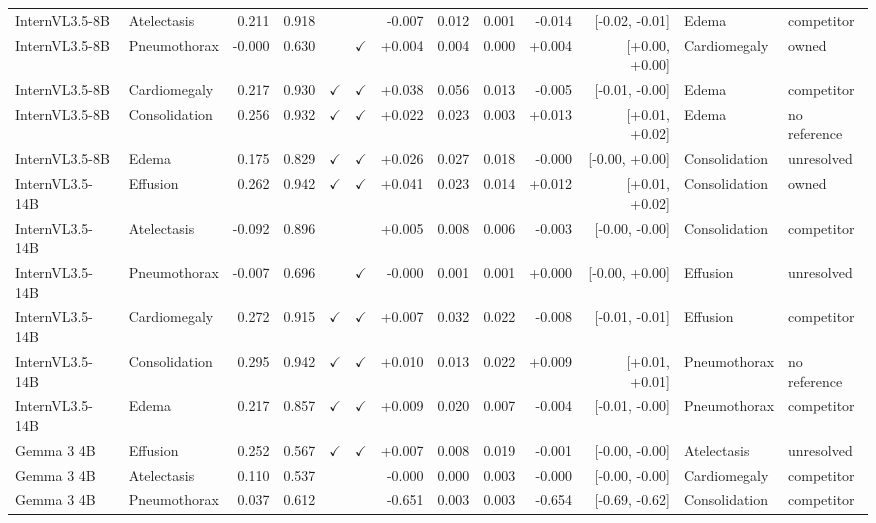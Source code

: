 \begin{longtable}{llrrccrrrrrll}
InternVL3.5-8B & Atelectasis & 0.211 & 0.918 &  &  & -0.007 & 0.012 & 0.001 & -0.014 & [-0.02, -0.01] & Edema & competitor \\
\rowcolor{cfSlate2}InternVL3.5-8B & Pneumothorax & -0.000 & 0.630 &  & $\checkmark$ & +0.004 & 0.004 & 0.000 & +0.004 & [+0.00, +0.00] & Cardiomegaly & owned \\
InternVL3.5-8B & Cardiomegaly & 0.217 & 0.930 & $\checkmark$ & $\checkmark$ & +0.038 & 0.056 & 0.013 & -0.005 & [-0.01, -0.00] & Edema & competitor \\
InternVL3.5-8B & Consolidation & 0.256 & 0.932 & $\checkmark$ & $\checkmark$ & +0.022 & 0.023 & 0.003 & +0.013 & [+0.01, +0.02] & Edema & no reference \\
InternVL3.5-8B & Edema & 0.175 & 0.829 & $\checkmark$ & $\checkmark$ & +0.026 & 0.027 & 0.018 & -0.000 & [-0.00, +0.00] & Consolidation & unresolved \\
\rowcolor{cfSlate2}InternVL3.5-14B & Effusion & 0.262 & 0.942 & $\checkmark$ & $\checkmark$ & +0.041 & 0.023 & 0.014 & +0.012 & [+0.01, +0.02] & Consolidation & owned \\
InternVL3.5-14B & Atelectasis & -0.092 & 0.896 &  &  & +0.005 & 0.008 & 0.006 & -0.003 & [-0.00, -0.00] & Consolidation & competitor \\
InternVL3.5-14B & Pneumothorax & -0.007 & 0.696 &  & $\checkmark$ & -0.000 & 0.001 & 0.001 & +0.000 & [-0.00, +0.00] & Effusion & unresolved \\
InternVL3.5-14B & Cardiomegaly & 0.272 & 0.915 & $\checkmark$ & $\checkmark$ & +0.007 & 0.032 & 0.022 & -0.008 & [-0.01, -0.01] & Effusion & competitor \\
InternVL3.5-14B & Consolidation & 0.295 & 0.942 & $\checkmark$ & $\checkmark$ & +0.010 & 0.013 & 0.022 & +0.009 & [+0.01, +0.01] & Pneumothorax & no reference \\
InternVL3.5-14B & Edema & 0.217 & 0.857 & $\checkmark$ & $\checkmark$ & +0.009 & 0.020 & 0.007 & -0.004 & [-0.01, -0.00] & Pneumothorax & competitor \\
Gemma 3 4B & Effusion & 0.252 & 0.567 & $\checkmark$ & $\checkmark$ & +0.007 & 0.008 & 0.019 & -0.001 & [-0.00, -0.00] & Atelectasis & unresolved \\
Gemma 3 4B & Atelectasis & 0.110 & 0.537 &  &  & -0.000 & 0.000 & 0.003 & -0.000 & [-0.00, -0.00] & Cardiomegaly & competitor \\
Gemma 3 4B & Pneumothorax & 0.037 & 0.612 &  &  & -0.651 & 0.003 & 0.003 & -0.654 & [-0.69, -0.62] & Consolidation & competitor \\

\end{longtable}
